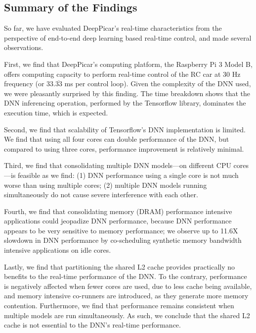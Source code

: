 \subsection{Summary of the Findings}
So far, we have evaluated DeepPicar's real-time
characteristics from the perspective of end-to-end deep learning based
real-time control, and made several observations.

First, we find that DeepPicar's computing platform,
the Raspberry Pi 3 Model B, offers computing capacity to
perform real-time control of the RC car at 30 Hz frequency (or
33.$\overline{\mbox{33}}$ ms  per control loop). Given the complexity of 
the DNN used, we were pleasantly surprised by this finding. 
The time breakdown shows that the DNN inferencing operation, 
performed by the Tensorflow library, dominates the execution time, 
which is expected.

Second, we find that scalability of Tensorflow's DNN 
implementation is limited. We find that using all four cores can double 
performance of the DNN, but compared to using three cores, performance
improvement is relatively minimal.

Third, we find that consolidating multiple DNN models---on different CPU
cores---is feasible as we find: (1) DNN performance using a single
core is not much worse than using multiple cores; (2) multiple DNN
models running simultaneously do not cause severe interference with
each other.

Fourth, we find that consolidating memory (DRAM) performance
intensive applications could jeopadize DNN performance, because DNN
performance appears to be very sensitive to memory performance; we 
observe up to 11.6X slowdown in DNN performance by co-scheduling 
synthetic memory bandwidth intensive applications on idle cores.

Lastly, we find that partitioning the shared L2 cache provides 
practically no benefits to the real-time performance of the DNN. To the 
contrary, performance is negatively affected when fewer cores are used, 
due to less cache being available, and memory intensive co-runners are 
introduced, as they generate more memory contention. Furthermore, we 
find that performance remains consistent when multiple models are run 
simultaneously. As such, we conclude that the shared L2 cache is not 
essential to the DNN's real-time performance.